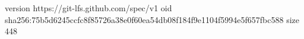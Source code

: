 version https://git-lfs.github.com/spec/v1
oid sha256:75b5d6245ccfc8f85726a38e0f60ea54db08f184f9e1104f5994e5f657fbc588
size 448
